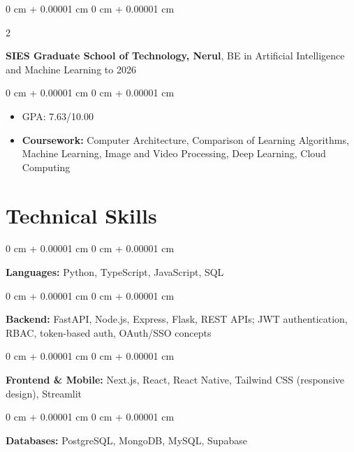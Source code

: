 \documentclass[10pt, letterpaper]{article}
\newenvironment{highlights}{
    \begin{itemize}[
        topsep=0.10 cm,
        parsep=0.10 cm,
        partopsep=0pt,
        itemsep=0pt,
        leftmargin=0 cm + 10pt
    ]
}{
    \end{itemize}
} %
\newenvironment{onecolentry}{
    \begin{adjustwidth}{
        0 cm + 0.00001 cm
    }{
        0 cm + 0.00001 cm
    }
}{
    \end{adjustwidth}
} %
\newenvironment{twocolentry}[2][]{
    \onecolentry
    \def\secondColumn{#2}
    \setcolumnwidth{\fill, 4.5 cm}
    \begin{paracol}{2}
}{
    \switchcolumn \raggedleft \secondColumn
    \end{paracol}
    \endonecolentry
} %
\begin{document}
        \begin{twocolentry}{
            2022 to 2026
        }
            \textbf{SIES Graduate School of Technology, Nerul}, BE in Artificial Intelligence and Machine Learning\end{twocolentry}

        \vspace{0.10 cm}
        \begin{onecolentry}
            \begin{highlights}
                \item GPA: 7.63/10.00
                \item \textbf{Coursework:} Computer Architecture, Comparison of Learning Algorithms, Machine Learning, Image and Video Processing, Deep Learning, Cloud Computing
            \end{highlights}
        \end{onecolentry}


    \section{Technical Skills}

        \begin{onecolentry}
            \textbf{Languages:} Python, TypeScript, JavaScript, SQL
        \end{onecolentry}

        \vspace{0.2 cm}

        \begin{onecolentry}
            \textbf{Backend:} FastAPI, Node.js, Express, Flask, REST APIs; JWT authentication, RBAC, token-based auth, OAuth/SSO concepts
        \end{onecolentry}

        \vspace{0.2 cm}

        \begin{onecolentry}
            \textbf{Frontend \& Mobile:} Next.js, React, React Native, Tailwind CSS (responsive design), Streamlit
        \end{onecolentry}

        \vspace{0.2 cm}

        \begin{onecolentry}
            \textbf{Databases:} PostgreSQL, MongoDB, MySQL, Supabase
        \end{onecolentry}
\end{document}
